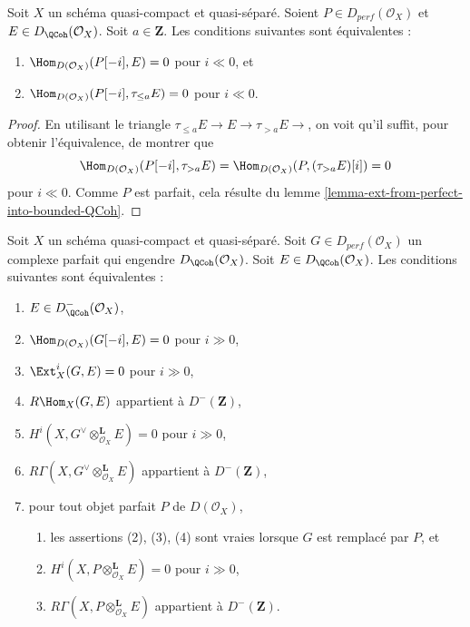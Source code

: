 \begin{lemma}
\label{lemma-bounded-below-truncation}
Soit $X$ un schéma quasi-compact et quasi-séparé. Soient
$P \in D_{perf}(\mathcal{O}_X)$ et $E \in D_{\QCoh}(\mathcal{O}_X)$.
Soit $a \in \mathbf{Z}$. Les conditions suivantes sont équivalentes :
\begin{enumerate}
\item $\Hom_{D(\mathcal{O}_X)}(P[-i], E) = 0$ pour $i \ll 0$, et
\item $\Hom_{D(\mathcal{O}_X)}(P[-i], \tau_{\leq a} E) = 0$ pour $i \ll 0$.
\end{enumerate}
\end{lemma}

\begin{proof}
En utilisant le triangle $ \tau_{\leq a} E \to E \to \tau_{> a} E \to$,
on voit qu'il suffit, pour obtenir l'équivalence, de montrer que
$$
\Hom_{D(\mathcal{O}_X)}(P[-i], \tau_{> a} E) =
\Hom_{D(\mathcal{O}_X)}(P, (\tau_{> a} E)[i]) = 0
$$
pour $i \ll 0$. Comme $P$ est parfait, cela résulte du
lemme \ref{lemma-ext-from-perfect-into-bounded-QCoh}.
\end{proof}

\begin{proposition}
\label{proposition-detecting-bounded-above}
Soit $X$ un schéma quasi-compact et quasi-séparé. Soit
$G \in D_{perf}(\mathcal{O}_X)$ un complexe parfait qui engendre 
$D_\QCoh (\mathcal{O}_X)$. Soit $E \in D_\QCoh (\mathcal{O}_X)$.
Les conditions suivantes sont équivalentes :
\begin{enumerate}
\item $E \in D^-_\QCoh (\mathcal{O}_X)$,
\item $\Hom_{D(\mathcal{O}_X)}(G[-i], E) = 0$ pour $i \gg 0$,
\item $\Ext^i_X(G, E) = 0$ pour $i \gg 0$,
\item $R\Hom_X(G, E)$ appartient à $D^-(\mathbf{Z})$,
\item $H^i(X, G^\vee \otimes_{\mathcal{O}_X}^\mathbf{L} E) = 0$
pour $i \gg 0$,
\item $R\Gamma(X, G^\vee \otimes_{\mathcal{O}_X}^\mathbf{L} E)$
appartient à $D^-(\mathbf{Z})$,
\item pour tout objet parfait $P$ de $D(\mathcal{O}_X)$,
\begin{enumerate}
\item les assertions (2), (3), (4) sont vraies lorsque $G$ est remplacé par $P$, et
\item $H^i(X, P \otimes_{\mathcal{O}_X}^\mathbf{L} E) = 0$ pour $i \gg 0$,
\item $R\Gamma(X, P \otimes_{\mathcal{O}_X}^\mathbf{L} E)$
appartient à $D^-(\mathbf{Z})$.
\end{enumerate}
\end{enumerate}
\end{proposition}

